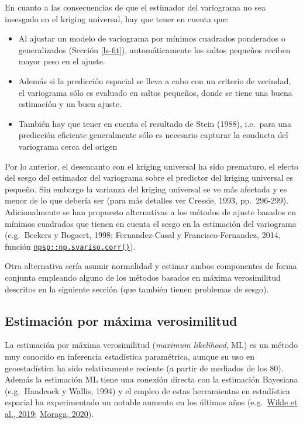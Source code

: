 \documentclass[
  spanish,
]{book}
\providecommand{\tightlist}{%
  \setlength{\itemsep}{0pt}\setlength{\parskip}{0pt}}
\theoremstyle{break}
\theoremstyle{definition}
\theoremstyle{definition}
\theoremstyle{definition}
\theoremstyle{definition}
\theoremstyle{remark}
\begin{document}
En cuanto a las consecuencias de que el estimador del variograma no sea insesgado en el kriging universal, hay que tener en cuenta que:

\begin{itemize}
\tightlist
\item
  Al ajustar un modelo de variograma por mínimos cuadrados ponderados o generalizados (Sección \ref{ls-fit}), automáticamente los saltos pequeños reciben mayor peso en el ajuste.
\item
  Además si la predicción espacial se lleva a cabo con un criterio de vecindad, el variograma sólo es evaluado en saltos pequeños, donde se tiene una buena estimación y un buen ajuste.
\item
  También hay que tener en cuenta el resultado de Stein (1988), i.e.~para una predicción eficiente generalmente sólo es necesario capturar la conducta del variograma cerca del origen
\end{itemize}

Por lo anterior, el desencanto con el kriging universal ha sido prematuro, el efecto del sesgo del estimador del variograma sobre el predictor del kriging universal es pequeño.
Sin embargo la varianza del kriging universal se ve más afectada y es menor de lo que debería ser (para más detalles ver Cressie, 1993, pp.~296-299).
Adicionalmente se han propuesto alternativas a los métodos de ajuste basados en mínimos cuadrados que tienen en cuenta el sesgo en la estimación del variograma (e.g.~Beckers y Bogaert, 1998; Fernandez-Casal y Francisco-Fernandez, 2014, función \href{https://rubenfcasal.github.io/npsp/reference/np.svar.html}{\texttt{npsp::np.svariso.corr()}}).

Otra alternativa sería asumir normalidad y estimar ambos componentes de forma conjunta empleando alguno de los métodos basados en máxima verosimilitud descritos en la siguiente sección (que también tienen problemas de sesgo).

\hypertarget{ml-fit}{%
\subsection{Estimación por máxima verosimilitud}\label{ml-fit}}

La estimación por máxima verosimilitud (\emph{maximum likelihood}, ML) es un método muy conocido en inferencia estadística paramétrica, aunque su uso en geoestadística ha sido relativamente reciente (a partir de mediados de los 80).
Además la estimación ML tiene una conexión directa con la estimación Bayesiana (e.g.~Handcock y Wallis, 1994) y el empleo de estas herramientas en estadística espacial ha experimentado un notable aumento en los últimos años (e.g.~\href{https://spacetimewithr.org/}{Wikle et al., 2019}; \href{https://www.paulamoraga.com/book-geospatial/}{Moraga, 2020}).
\end{document}
